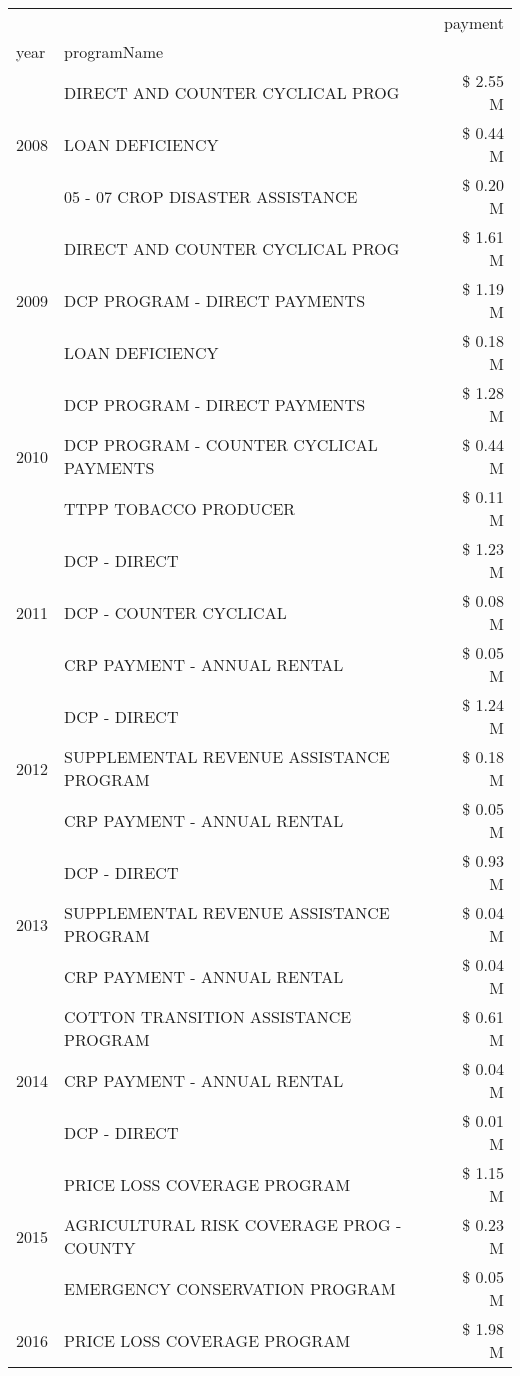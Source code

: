 \begin{tabular}{llr}
\toprule
 &  & payment \\
year & programName &  \\
\midrule
\multirow[t]{3}{*}{2008} & DIRECT AND COUNTER CYCLICAL PROG & \$ 2.55 M \\
 & LOAN DEFICIENCY & \$ 0.44 M \\
 & 05 - 07 CROP DISASTER ASSISTANCE & \$ 0.20 M \\
\cline{1-3}
\multirow[t]{3}{*}{2009} & DIRECT AND COUNTER CYCLICAL PROG & \$ 1.61 M \\
 & DCP PROGRAM - DIRECT PAYMENTS & \$ 1.19 M \\
 & LOAN DEFICIENCY & \$ 0.18 M \\
\cline{1-3}
\multirow[t]{3}{*}{2010} & DCP PROGRAM - DIRECT PAYMENTS & \$ 1.28 M \\
 & DCP PROGRAM - COUNTER CYCLICAL PAYMENTS & \$ 0.44 M \\
 & TTPP TOBACCO PRODUCER & \$ 0.11 M \\
\cline{1-3}
\multirow[t]{3}{*}{2011} & DCP - DIRECT & \$ 1.23 M \\
 & DCP - COUNTER CYCLICAL & \$ 0.08 M \\
 & CRP PAYMENT - ANNUAL RENTAL & \$ 0.05 M \\
\cline{1-3}
\multirow[t]{3}{*}{2012} & DCP - DIRECT & \$ 1.24 M \\
 & SUPPLEMENTAL REVENUE ASSISTANCE PROGRAM & \$ 0.18 M \\
 & CRP PAYMENT - ANNUAL RENTAL & \$ 0.05 M \\
\cline{1-3}
\multirow[t]{3}{*}{2013} & DCP - DIRECT & \$ 0.93 M \\
 & SUPPLEMENTAL REVENUE ASSISTANCE PROGRAM & \$ 0.04 M \\
 & CRP PAYMENT - ANNUAL RENTAL & \$ 0.04 M \\
\cline{1-3}
\multirow[t]{3}{*}{2014} & COTTON TRANSITION ASSISTANCE PROGRAM & \$ 0.61 M \\
 & CRP PAYMENT - ANNUAL RENTAL & \$ 0.04 M \\
 & DCP - DIRECT & \$ 0.01 M \\
\cline{1-3}
\multirow[t]{3}{*}{2015} & PRICE LOSS COVERAGE PROGRAM & \$ 1.15 M \\
 & AGRICULTURAL RISK COVERAGE PROG - COUNTY & \$ 0.23 M \\
 & EMERGENCY CONSERVATION PROGRAM & \$ 0.05 M \\
\cline{1-3}
\multirow[t]{3}{*}{2016} & PRICE LOSS COVERAGE PROGRAM & \$ 1.98 M \\

\end{tabular}
